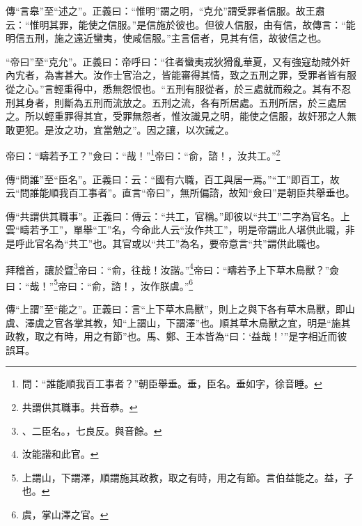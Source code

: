 {\noindent\zhuan{}\fzbyks 傳“言皋”至“述之”。正義曰：“惟明”謂之明，“克允”謂受罪者信服。故王肅云：“惟明其罪，能使之信服。”是信施於彼也。但彼人信服，由有信，故傳言：“能明信五刑，施之遠近蠻夷，使咸信服。”主言信者，見其有信，故彼信之也。 \par}

{\noindent\shu{}\fzkt “帝曰”至“克允”。正義曰：帝呼曰：“往者蠻夷戎狄猾亂華夏，又有強寇劫賊外奸內宄者，為害甚大。汝作士官治之，皆能審得其情，致之五刑之罪，受罪者皆有服從之心。”言輕重得中，悉無怨恨也。“五刑有服從者，於三處就而殺之。其有不忍刑其身者，則斷為五刑而流放之。五刑之流，各有所居處。五刑所居，於三處居之。所以輕重罪得其宜，受罪無怨者，惟汝識見之明，能使之信服，故奸邪之人無敢更犯。是汝之功，宜當勉之”。因之讓，以次誡之。 \par}

帝曰：“疇若予工？”僉曰：“哉！”\footnote{問：“誰能順我百工事者？”朝臣舉垂。垂，臣名。垂如字，徐音睡。}帝曰：“俞，諮！，汝共工。”\footnote{共謂供其職事。共音恭。}

{\noindent\zhuan{}\fzbyks 傳“問誰”至“臣名”。正義曰：云：“國有六職，百工與居一焉。”“工”即百工，故云“問誰能順我百工事者”。直言“帝曰”，無所偏諮，故知“僉曰”是朝臣共舉垂也。 \par}

{\noindent\zhuan{}\fzbyks 傳“共謂供其職事”。正義曰：傳云：“共工，官稱。”即彼以“共工”二字為官名。上雲“疇若予工”，單舉“工”名，今命此人云“汝作共工”，明是帝謂此人堪供此職，非是呼此官名為“共工”也。其官或以“共工”為名，要帝意言“共”謂供此職也。 \par}

拜稽首，讓於暨\footnote{、二臣名。，七良反。與音餘。}帝曰：“俞，往哉！汝諧。”\footnote{汝能諧和此官。}帝曰：“疇若予上下草木鳥獸？”僉曰：“哉！”\footnote{上謂山，下謂澤，順謂施其政教，取之有時，用之有節。言伯益能之。益，子也。}帝曰：“俞，諮！，汝作朕虞。”\footnote{虞，掌山澤之官。}

{\noindent\zhuan{}\fzbyks 傳“上謂”至“能之”。正義曰：言“上下草木鳥獸”，則上之與下各有草木鳥獸，即山虞、澤虞之官各掌其教，知“上謂山，下謂澤”也。順其草木鳥獸之宜，明是“施其政教，取之有時，用之有節”也。馬、鄭、王本皆為“曰：‘益哉！’”是字相近而彼誤耳。 \par}

